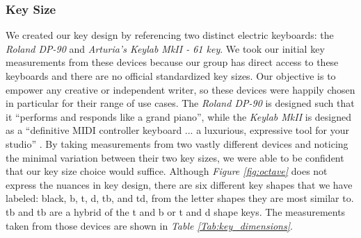 \subsubsection{Key Size}
We created our key design by referencing two distinct electric keyboards: the \textit{Roland DP-90} and \textit{Arturia’s Keylab MkII - 61 key}. We took our initial key measurements from these devices because our group has direct access to these keyboards and there are no official standardized key sizes. Our objective is to empower any creative or independent writer, so these devices were happily chosen in particular for their range of use cases. The \textit{Roland DP-90} is designed such that it “performs and responds like a grand piano”, while the \textit{Keylab MkII} is designed as a “definitive MIDI controller keyboard ... a luxurious, expressive tool for your studio” . By taking measurements from two vastly different devices and noticing the minimal variation between their two key sizes, we were able to be confident that our key size choice would suffice. Although \textit{Figure \ref{fig:octave}} does not express the nuances in key design, there are six different key shapes that we have labeled: black, b, t, d, tb, and td, from the letter shapes they are most similar to. tb and tb are a hybrid of the t and b or t and d shape keys. The measurements taken from those devices are shown in \textit{Table \ref{Tab:key_dimensions}}.

